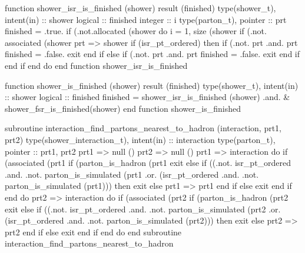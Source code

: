 \eatline
\nwendcode{}\nwdocspar
\nwenddocs{}\plusendmoddef
  function shower_isr_is_finished (shower) result (finished)
    type(shower_t), intent(in) :: shower
    logical :: finished
    integer :: i
    type(parton_t), pointer :: prt
    finished = .true.
    if (.not.allocated (shower%
    do i = 1, size (shower%
       if (.not. associated (shower%
       prt => shower%
       if (isr_pt_ordered) then
          if (.not. prt%
              .and. prt%
             finished = .false.
             exit
          end if
       else
          if (.not. prt%
              .and. prt%
             finished = .false.
             exit
          end if
       end if
    end do
  end function shower_isr_is_finished

\eatline
\nwendcode{}\nwdocspar
\nwenddocs{}\endmoddef
  function shower_is_finished (shower) result (finished)
    type(shower_t), intent(in) :: shower
    logical :: finished
    finished = shower_isr_is_finished (shower) .and. &
               shower_fsr_is_finished(shower)
  end function shower_is_finished

\eatline
\nwendcode{}\nwdocspar
\nwenddocs{}\plusendmoddef
  subroutine interaction_find_partons_nearest_to_hadron (interaction, prt1, prt2)
    type(shower_interaction_t), intent(in) :: interaction
    type(parton_t), pointer :: prt1, prt2
    prt1 => null ()
    prt2 => null ()
    prt1 => interaction%
    do
       if (associated (prt1%
          if (parton_is_hadron (prt1%
             exit
          else if ((.not. isr_pt_ordered .and. .not. parton_is_simulated (prt1%
               .or. (isr_pt_ordered .and. .not. parton_is_simulated (prt1))) then
             exit
          else
             prt1 => prt1%
          end if
       else
          exit
       end if
    end do
    prt2 => interaction%
    do
       if (associated (prt2%
          if (parton_is_hadron (prt2%
             exit
          else if ((.not. isr_pt_ordered .and. .not. parton_is_simulated (prt2%
               .or. (isr_pt_ordered .and. .not. parton_is_simulated (prt2))) then
             exit
          else
             prt2 => prt2%
          end if
       else
          exit
       end if
    end do
  end subroutine interaction_find_partons_nearest_to_hadron

